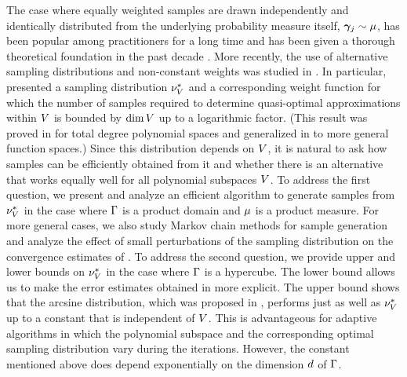 The case where equally weighted samples are drawn independently and identically distributed from the underlying probability measure itself, $\bm{\gamma}_j\sim\mu$, has been popular among practitioners for a long time and has been given a thorough theoretical foundation in the past decade  \cite{ChkifaCohenMiglioratiEtAl2015,Cohen2013,MiglioratiNobileTempone2015}. 
More recently, the use of alternative sampling distributions and non-constant weights was studied in \cite{narayan2014christoffel,cohen2016optimal,hampton2015coherence}. In particular, \cite{hampton2015coherence} presented a sampling distribution $\nu^{*}_{V}$ and a corresponding weight function for which the number of samples required to determine quasi-optimal approximations within $V$ is bounded by $\dim V$ up to a logarithmic factor. (This result was proved in \cite{hampton2015coherence} for total degree polynomial spaces and generalized in \cite{cohen2016optimal} to more general function spaces.) Since this distribution depends on $V$, it is natural to ask how samples can be efficiently obtained from it and whether there is an alternative that works equally well for all polynomial subspaces $V$. 
To address the first question, we present and analyze an efficient algorithm to generate samples from $\nu^{*}_{V}$ in the case where $\Gamma$ is a product domain and $\mu$ is a product measure. For more general cases, we also study Markov chain methods for sample generation and analyze the effect of small perturbations of the sampling distribution on the convergence estimates of \cite{hampton2015coherence,cohen2016optimal}. To address the second question, we provide upper and lower bounds on $\nu^{*}_{V}$ in the case where $\Gamma$ is a hypercube. The lower bound allows us to make the error estimates obtained in \cite{cohen2016optimal} more explicit. The upper bound shows that the arcsine distribution, which was proposed in \cite{narayan2014christoffel}, performs just as well as $\nu^{*}_{V}$ up to a constant that is independent of $V$. This is advantageous for adaptive algorithms in which the polynomial subspace and the corresponding optimal sampling distribution vary during the iterations. However, the constant mentioned above does depend exponentially on the dimension $d$ of $\Gamma$. 
\\

